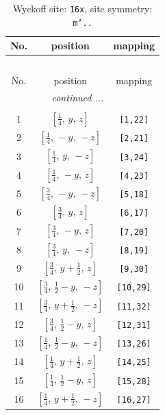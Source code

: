 \documentclass[fleqn,8pt]{jsarticle}
\begin{document}
\renewcommand{\arraystretch}{1.2}
\begin{longtable}{ccc}
\caption{Wyckoff site: {\tt 16x}, site symmetry: {\tt m'..}}
 \\
 \hline \hline
No. & position & mapping \\ \hline \endfirsthead

\multicolumn{2}{l}{\tablename\ \thetable{}} \\
 \hline \hline
No. & position & mapping \\ \hline \endhead

 \hline \hline
\multicolumn{2}{r}{\footnotesize\it continued ...} \\ \endfoot

 \hline \hline
\multicolumn{2}{r}{} \\ \endlastfoot

1 & $\left[ \frac{1}{4},\, y,\, z \right]$ & {\tt [1,22]} \\ \hline
2 & $\left[ \frac{1}{4},\, - y,\, - z \right]$ & {\tt [2,21]} \\ \hline
3 & $\left[ \frac{1}{4},\, y,\, - z \right]$ & {\tt [3,24]} \\ \hline
4 & $\left[ \frac{1}{4},\, - y,\, z \right]$ & {\tt [4,23]} \\ \hline
5 & $\left[ \frac{3}{4},\, - y,\, - z \right]$ & {\tt [5,18]} \\ \hline
6 & $\left[ \frac{3}{4},\, y,\, z \right]$ & {\tt [6,17]} \\ \hline
7 & $\left[ \frac{3}{4},\, - y,\, z \right]$ & {\tt [7,20]} \\ \hline
8 & $\left[ \frac{3}{4},\, y,\, - z \right]$ & {\tt [8,19]} \\ \hline
9 & $\left[ \frac{3}{4},\, y + \frac{1}{2},\, z \right]$ & {\tt [9,30]} \\ \hline
10 & $\left[ \frac{3}{4},\, \frac{1}{2} - y,\, - z \right]$ & {\tt [10,29]} \\ \hline
11 & $\left[ \frac{3}{4},\, y + \frac{1}{2},\, - z \right]$ & {\tt [11,32]} \\ \hline
12 & $\left[ \frac{3}{4},\, \frac{1}{2} - y,\, z \right]$ & {\tt [12,31]} \\ \hline
13 & $\left[ \frac{1}{4},\, \frac{1}{2} - y,\, - z \right]$ & {\tt [13,26]} \\ \hline
14 & $\left[ \frac{1}{4},\, y + \frac{1}{2},\, z \right]$ & {\tt [14,25]} \\ \hline
15 & $\left[ \frac{1}{4},\, \frac{1}{2} - y,\, z \right]$ & {\tt [15,28]} \\ \hline
16 & $\left[ \frac{1}{4},\, y + \frac{1}{2},\, - z \right]$ & {\tt [16,27]} \\
\end{longtable}
\end{document}
